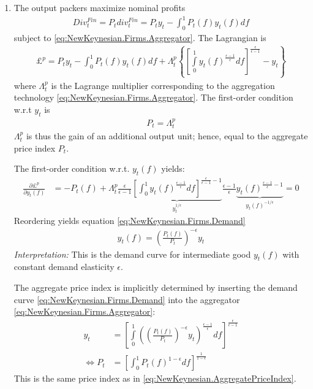 \begin{enumerate}
\item The output packers maximize nominal profits
\begin{align*}
Div_t^{Fin} = P_t div_t^{Fin} = P_t y_t - \int_{0}^{1} P_t(f) y_t(f) df
\end{align*}
subject to \eqref{eq:NewKeynesian.Firms.Aggregator}.
The Lagrangian is
\begin{align*}
\pounds^{p} = P_t y_t - \int_{0}^{1} P_t(f) y_t(f) df + \Lambda_t^p \left\{\left[\int\limits_0^1 y_t(f)^{\frac{\epsilon-1}{\epsilon}}df\right]^{\frac{\epsilon}{\epsilon-1}} - y_t\right\}
\end{align*}
  where $\Lambda_t^p$ is the Lagrange multiplier corresponding to the aggregation technology \eqref{eq:NewKeynesian.Firms.Aggregator}.
The first-order condition w.r.t $y_t$ is
\begin{align*}
P_t = \Lambda_{t}^p
\end{align*}
$\Lambda_{t}^p$ is thus the gain of an additional output unit; hence, equal to the aggregate price index $P_t$.

The first-order condition w.r.t. $y_t(f)$ yields:
\begin{align*}
\frac{\partial \pounds^{p} }{\partial y_t(f)} & = -P_t(f) + \Lambda_{t}^p \frac{\epsilon}{\epsilon-1} \underbrace{\left[\int_{0}^1 y_t(f)^{\frac{\epsilon-1}{\epsilon}}df\right]^{\frac{\epsilon}{\epsilon-1}-1}}_{y_t^{1/\epsilon}} \frac{\epsilon-1}{\epsilon} \underbrace{y_t(f)^{\frac{\epsilon-1}{\epsilon}-1}}_{y_t(f)^{-1/\epsilon}} = 0
\end{align*}
Reordering yields equation \eqref{eq:NewKeynesian.Firms.Demand}
\begin{align*}
y_t(f) = \left(\frac{P_t(f)}{P_t}\right)^{-\epsilon} y_t
\end{align*}
\emph{Interpretation:}
This is the demand curve for intermediate good $y_t(f)$ with constant demand elasticity $\epsilon$.

The aggregate price index is implicitly determined by inserting the demand curve \eqref{eq:NewKeynesian.Firms.Demand} into the aggregator \eqref{eq:NewKeynesian.Firms.Aggregator}:
\begin{align*}
y_t &= \left[\int\limits_0^1 \left(\left(\frac{P_t(f)}{P_t}\right)^{-\epsilon} y_t\right)^{\frac{\epsilon-1}{\epsilon}}df\right]^{\frac{\epsilon}{\epsilon-1}}
\\
\Leftrightarrow
P_t &= \left[\int_{0}^{1} P_t(f)^{1-\epsilon}df\right]^{\frac{1}{1-\epsilon}}
\end{align*}
This is the same price index as in \eqref{eq:NewKeynesian.AggregatePriceIndex}.


\end{enumerate}
